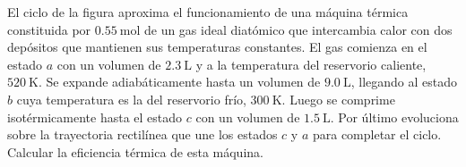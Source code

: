 \documentclass[a4paper,11pt,dvipsnames]{article}
\begin{document}
\begin{enumerate}[leftmargin=*]
  \begin{minipage}[t]{.5\textwidth}
  \item El ciclo de la figura aproxima el funcionamiento de una máquina térmica constituida por $\SI{0.55}{\mole}$ de un gas ideal diatómico que intercambia calor con dos depósitos que mantienen sus temperaturas constantes. El gas comienza en el estado $a$ con un volumen de $\SI{2.3}{\liter}$ y a la temperatura del reservorio caliente, $\SI{520}{\kelvin}$. Se expande adiabáticamente hasta un volumen de $\SI{9.0}{\liter}$, llegando al estado $b$ cuya temperatura es la del reservorio frío, $\SI{300}{\kelvin}$. Luego se comprime isotérmicamente hasta el estado $c$ con un volumen de $\SI{1.5}{\liter}$. Por último evoluciona sobre la trayectoria rectilínea que une los estados $c$ y $a$ para completar el ciclo. Calcular la eficiencia térmica de esta máquina. 
    \end{minipage}
  \hspace{0.02\linewidth}
  \begin{minipage}[t]{.4\textwidth}
    \strut\vspace*{-\baselineskip}\newline
  \begin{center}
  \end{center}
\end{minipage}


\end{enumerate}
\end{document}
